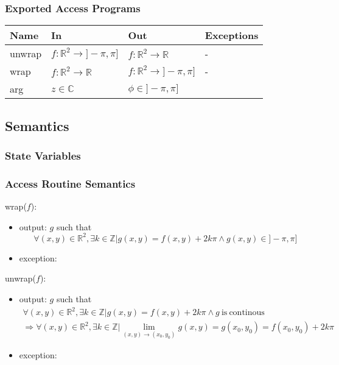 \documentclass[12pt, titlepage]{article}
\begin{document}
\subsubsection{Exported Access Programs}

\begin{center}
\begin{tabular}{p{2cm} p{4cm} p{4cm} p{2cm}}
\hline
\textbf{Name} & \textbf{In} & \textbf{Out} & \textbf{Exceptions} \\
\hline
unwrap & $f:\mathbb{R}^2\rightarrow]-\pi,\pi]$ & $f:\mathbb{R}^2\rightarrow\mathbb{R}$ & - \\
wrap & $f:\mathbb{R}^2\rightarrow\mathbb{R}$ & $f:\mathbb{R}^2\rightarrow]-\pi,\pi]$ & - \\
arg & $z \in \mathbb{C}$ & $\phi \in ]-\pi,\pi]$ & \\
\hline
\end{tabular}
\end{center}

\subsection{Semantics}

\subsubsection{State Variables}


\subsubsection{Access Routine Semantics}

\noindent wrap($f$):
\begin{itemize} 
\item output: $g$ such that
\begin{equation*}
\forall (x,y) \in \mathbb{R}^2, \exists k \in \mathbb{Z} | g(x,y) =f(x,y)+ 2k\pi \wedge g(x,y) \in ]-\pi,\pi]
\end{equation*} 
\item exception:
\end{itemize}

\noindent unwrap($f$):
\begin{itemize} 
\item output: $g$ such that
\begin{equation*}
\begin{gathered}
\forall (x,y) \in \mathbb{R}^2, \exists k \in \mathbb{Z} | g(x,y) =f(x,y) + 2k\pi \wedge g \ \text{is} \  \text{continous}\\
\Rightarrow \forall (x,y) \in \mathbb{R}^2, \exists k \in \mathbb{Z} | \lim_{(x,y)\to (x_0,y_0)} g(x,y) = g(x_0,y_0) = f(x_0,y_0) + 2k\pi
\end{gathered}
\end{equation*}
\item exception:
\end{itemize}
\end{document}
